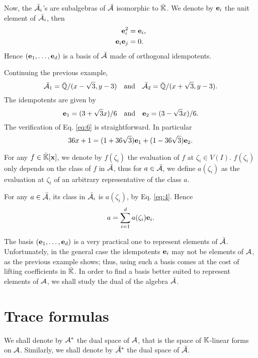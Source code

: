 Now, the $\bar{\mathcal{A}}_i$'s are subalgebras of $\bar{\mathcal{A}}$
isomorphic to $\bar{\mathbb{K}}$. We denote by $\mathbf{e}_i$ the unit element
of $\bar{\mathcal{A}}_i$, then
\begin{equation}
  \label{eq:6}
  \begin{aligned}
    \mathbf{e}_i^2 &= \mathbf{e}_i\text{,}\\
    \mathbf{e}_i\mathbf{e}_j &= 0\text{.}
  \end{aligned}
\end{equation}
Hence $(\mathbf{e}_1,\ldots,\mathbf{e}_d)$ is a basis of
$\bar{\mathcal{A}}$ made of orthogonal idempotents.

\begin{example}
  \label{ex:trace}
  Continuing the previous example, 
  \[\bar{\mathcal{A}}_1 = \bar{\mathbb{Q}}/(x-\sqrt{3},y-3)
  \quad\text{and}\quad
  \bar{\mathcal{A}}_2 = \bar{\mathbb{Q}}/(x+\sqrt{3},y-3)
  \text{.}\]
  The idempotents are given by
  \[\mathbf{e}_1 = (3+\sqrt{3}x)/6
  \quad\text{and}\quad \mathbf{e}_2 = (3-\sqrt{3}x)/6 \text{.}\] The
  verification of Eq. \eqref{eq:6} is straightforward. In particular
  \[36x + 1 = (1+36\sqrt{3})\mathbf{e}_1 + (1-36\sqrt{3})\mathbf{e}_2
  \text{.}\]
\end{example}

For any $f\in\bar{\mathbb{K}}[\mathbf{x}]$, we denote by $f(\zeta_i)$ the
evaluation of $f$ at $\zeta_i\in V(I)$. $f(\zeta_i)$ only depends on
the class of $f$ in $\mathcal{\bar{A}}$, thus for
$a\in\bar{\mathcal{A}}$, we define $a(\zeta_i)$ as the evaluation at
$\zeta_i$ of an arbitrary representative of the class $a$.

For any $a\in\bar{\mathcal{A}}$, its class in $\bar{\mathcal{A}}_i$ is $a(\zeta_i)$,
by Eq. \eqref{eq:4}. Hence
\begin{equation}
  \label{eq:2}
  a = \sum_{i=1}^da(\zeta_i)\mathbf{e}_i
  \text{.}
\end{equation}

The basis $(\mathbf{e}_1,\ldots,\mathbf{e}_d)$ is a very practical one
to represent elements of $\bar{\mathcal{A}}$. Unfortunately, in the
general case the idempotents $\mathbf{e}_i$ may not be elements of
$\mathcal{A}$, as the previous example shows; thus, using such a basis
comes at the cost of lifting coefficients in $\bar{\mathbb{K}}$. In order to
find a basis better suited to represent elements of $\mathcal{A}$, we
shall study the dual of the algebra $\bar{\mathcal{A}}$.


\section{Trace formulas}
\label{sec:dual}
We shall denote by $\mathcal{A}^\ast$ the dual space of $\mathcal{A}$,
that is the space of $\mathbb{K}$-linear forms on $\mathcal{A}$. Similarly, we
shall denote by $\bar{\mathcal{A}}^\ast$ the dual space of
$\bar{\mathcal{A}}$.

